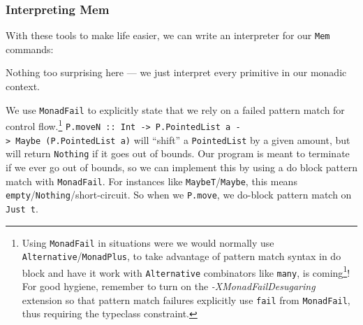 \documentclass[]{article}
\newenvironment{Shaded}{}{}
\newcommand{\CommentTok}[1]{\textcolor[rgb]{0.38,0.63,0.69}{\textit{#1}}}
\newcommand{\DataTypeTok}[1]{\textcolor[rgb]{0.56,0.13,0.00}{#1}}
\newcommand{\DecValTok}[1]{\textcolor[rgb]{0.25,0.63,0.44}{#1}}
\newcommand{\KeywordTok}[1]{\textcolor[rgb]{0.00,0.44,0.13}{\textbf{#1}}}
\newcommand{\NormalTok}[1]{#1}
\newcommand{\OperatorTok}[1]{\textcolor[rgb]{0.40,0.40,0.40}{#1}}
\newcommand{\OtherTok}[1]{\textcolor[rgb]{0.00,0.44,0.13}{#1}}
\renewcommand{\href}[2]{#2\footnote{\url{#1}}}
\begin{document}
\subsubsection{Interpreting Mem}\label{interpreting-mem}

With these tools to make life easier, we can write an interpreter for our
\texttt{Mem} commands:

\begin{Shaded}
\end{Shaded}

Nothing too surprising here --- we just interpret every primitive in our monadic
context.

We use \texttt{MonadFail} to explicitly state that we rely on a failed pattern
match for control flow.\footnote{Using \texttt{MonadFail} in situations were we
  would normally use \texttt{Alternative}/\texttt{MonadPlus}, to take advantage
  of pattern match syntax in do block and have it work with \texttt{Alternative}
  combinators like \texttt{many}, is
  \href{https://wiki.haskell.org/MonadFail_Proposal}{coming}! For good hygiene,
  remember to turn on the \emph{-XMonadFailDesugaring} extension so that pattern
  match failures explicitly use \texttt{fail} from \texttt{MonadFail}, thus
  requiring the typeclass constraint.}
\texttt{P.moveN\ ::\ Int\ -\textgreater{}\ P.PointedList\ a\ -\textgreater{}\ Maybe\ (P.PointedList\ a)}
will ``shift'' a \texttt{PointedList} by a given amount, but will return
\texttt{Nothing} if it goes out of bounds. Our program is meant to terminate if
we ever go out of bounds, so we can implement this by using a do block pattern
match with \texttt{MonadFail}. For instances like
\texttt{MaybeT}/\texttt{Maybe}, this means
\texttt{empty}/\texttt{Nothing}/short-circuit. So when we \texttt{P.move}, we
do-block pattern match on \texttt{Just\ t\textquotesingle{}}.
\end{document}
